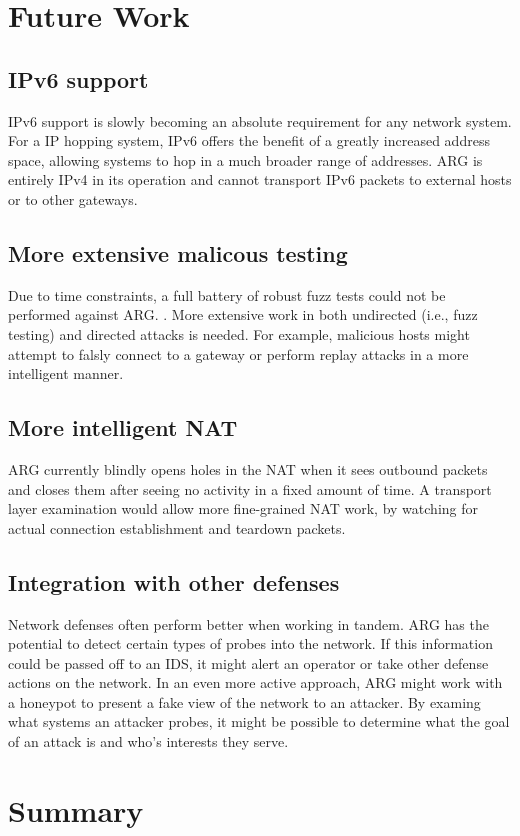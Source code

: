 \section{Future Work}
\subsection{IPv6 support}
\par \ac{IPv6} support is slowly becoming an absolute requirement for any network system. For a \ac{IP} hopping system, \ac{IPv6} offers the benefit of a greatly increased address space, allowing systems to hop in a much broader range of addresses. \ac{ARG} is entirely \ac{IPv4} in its operation and cannot transport \ac{IPv6} packets to external hosts or to other gateways.

\subsection{More extensive malicous testing}
\par Due to time constraints, a full battery of robust fuzz tests could not be performed against \ac{ARG}. . More extensive work in both undirected (i.e., fuzz testing) and directed attacks is needed. For example, malicious hosts might attempt to falsly connect to a gateway or perform replay attacks in a more intelligent manner. 

\subsection{More intelligent NAT}
\par \ac{ARG} currently blindly opens holes in the \ac{NAT} when it sees outbound packets and closes them after seeing no activity in a fixed amount of time. A transport layer examination would allow more fine-grained \ac{NAT} work, by watching for actual connection establishment and teardown packets. 

\subsection{Integration with other defenses}
\par Network defenses often perform better when working in tandem. \ac{ARG} has the potential to detect certain types of probes into the network. If this information could be passed off to an \ac{IDS}, it might alert an operator or take other defense actions on the network. In an even more active approach, \ac{ARG} might work with a honeypot to present a fake view of the network to an attacker. By examing what systems an attacker probes, it might be possible to determine what the goal of an attack is and who's interests they serve.

\section{Summary}

